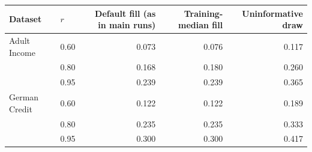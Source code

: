 \begin{tabular}{@{}llrrr@{}}
\toprule
Dataset & $r$ & Default fill (as in main runs) & Training-median fill & Uninformative draw \\
\midrule
Adult Income & 0.60 & 0.073 & 0.076 & 0.117 \\
 & 0.80 & 0.168 & 0.180 & 0.260 \\
 & 0.95 & 0.239 & 0.239 & 0.365 \\
\addlinespace
German Credit & 0.60 & 0.122 & 0.122 & 0.189 \\
 & 0.80 & 0.235 & 0.235 & 0.333 \\
 & 0.95 & 0.300 & 0.300 & 0.417 \\
\bottomrule
\end{tabular}
